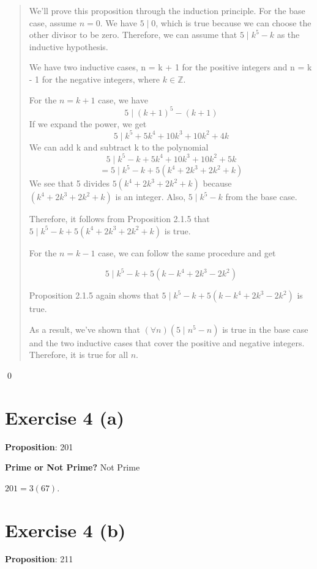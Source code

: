 \documentclass{article} %
\begin{document}
\begin{quote}
    We'll prove this proposition through the induction principle.
    For the base case, assume $n = 0$. We have $5 \mid 0$, which is true because we can choose the other divisor to be zero.
    Therefore, we can assume that $5 \mid k^5 - k$ as the inductive hypothesis.
    \bigskip

    We have two inductive cases, n = k + 1 for the positive integers and n = k - 1 for the negative integers, where $k \in \mathbb{Z}$.
    \bigskip

    For the $n = k + 1$ case, we have
    \[5 \mid (k + 1)^5 - (k + 1)\]
    If we expand the power, we get
    \[5 \mid k^5 + 5k^4 +10k^3 + 10k^2 + 4k\]
    We can add k and subtract k to the polynomial
    \[5 \mid k^5 - k + 5k^4 +10k^3 + 10k^2 + 5k\]
    \[= 5 \mid k^5 - k + 5(k^4 + 2k^3 + 2k^2+k)\]
    We see that 5 divides $5(k^4 + 2k^3 + 2k^2+k)$ because $(k^4 + 2k^3 + 2k^2+k)$ is an integer.
    Also, $5 \mid k^5 - k$ from the base case.

    Therefore, it follows from Proposition 2.1.5 that $5 \mid k^5 - k + 5(k^4 + 2k^3 + 2k^2+k)$ is true.

    \bigskip
    For the $n = k - 1$ case, we can follow the same procedure and get

    \[5 \mid k^5 - k + 5(k -k^4 + 2k^3 - 2k^2)\]

    Proposition 2.1.5 again shows that $5 \mid k^5 - k + 5(k -k^4 + 2k^3 - 2k^2)$ is true.

    As a result, we've shown that $(\forall n)(5 \mid n^5 - n)$ is true in the base case and the two inductive cases that cover the positive and negative integers. Therefore, it is true for all $n$.
\end{quote}
\qed
\bigskip

\section*{Exercise 4 (a)}

\bigskip
\noindent
\textbf{Proposition}: 201

\bigskip
\noindent
\textbf{Prime or Not Prime?} Not Prime

$201 = 3 (67)$.
\bigskip

\section*{Exercise 4 (b)}

\bigskip
\noindent
\textbf{Proposition}: 211
\end{document}
